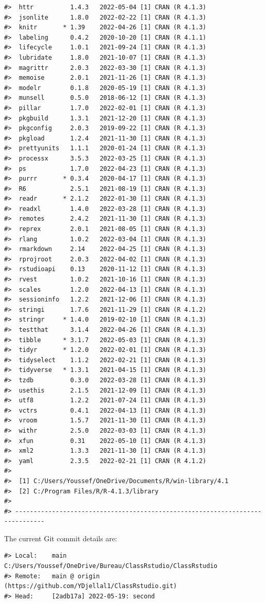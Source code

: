 \documentclass[
]{article}
\begin{document}
\begin{verbatim}
#>  httr          1.4.3   2022-05-04 [1] CRAN (R 4.1.3)
#>  jsonlite      1.8.0   2022-02-22 [1] CRAN (R 4.1.3)
#>  knitr       * 1.39    2022-04-26 [1] CRAN (R 4.1.3)
#>  labeling      0.4.2   2020-10-20 [1] CRAN (R 4.1.1)
#>  lifecycle     1.0.1   2021-09-24 [1] CRAN (R 4.1.3)
#>  lubridate     1.8.0   2021-10-07 [1] CRAN (R 4.1.3)
#>  magrittr      2.0.3   2022-03-30 [1] CRAN (R 4.1.3)
#>  memoise       2.0.1   2021-11-26 [1] CRAN (R 4.1.3)
#>  modelr        0.1.8   2020-05-19 [1] CRAN (R 4.1.3)
#>  munsell       0.5.0   2018-06-12 [1] CRAN (R 4.1.3)
#>  pillar        1.7.0   2022-02-01 [1] CRAN (R 4.1.3)
#>  pkgbuild      1.3.1   2021-12-20 [1] CRAN (R 4.1.3)
#>  pkgconfig     2.0.3   2019-09-22 [1] CRAN (R 4.1.3)
#>  pkgload       1.2.4   2021-11-30 [1] CRAN (R 4.1.3)
#>  prettyunits   1.1.1   2020-01-24 [1] CRAN (R 4.1.3)
#>  processx      3.5.3   2022-03-25 [1] CRAN (R 4.1.3)
#>  ps            1.7.0   2022-04-23 [1] CRAN (R 4.1.3)
#>  purrr       * 0.3.4   2020-04-17 [1] CRAN (R 4.1.3)
#>  R6            2.5.1   2021-08-19 [1] CRAN (R 4.1.3)
#>  readr       * 2.1.2   2022-01-30 [1] CRAN (R 4.1.3)
#>  readxl        1.4.0   2022-03-28 [1] CRAN (R 4.1.3)
#>  remotes       2.4.2   2021-11-30 [1] CRAN (R 4.1.3)
#>  reprex        2.0.1   2021-08-05 [1] CRAN (R 4.1.3)
#>  rlang         1.0.2   2022-03-04 [1] CRAN (R 4.1.3)
#>  rmarkdown     2.14    2022-04-25 [1] CRAN (R 4.1.3)
#>  rprojroot     2.0.3   2022-04-02 [1] CRAN (R 4.1.3)
#>  rstudioapi    0.13    2020-11-12 [1] CRAN (R 4.1.3)
#>  rvest         1.0.2   2021-10-16 [1] CRAN (R 4.1.3)
#>  scales        1.2.0   2022-04-13 [1] CRAN (R 4.1.3)
#>  sessioninfo   1.2.2   2021-12-06 [1] CRAN (R 4.1.3)
#>  stringi       1.7.6   2021-11-29 [1] CRAN (R 4.1.2)
#>  stringr     * 1.4.0   2019-02-10 [1] CRAN (R 4.1.3)
#>  testthat      3.1.4   2022-04-26 [1] CRAN (R 4.1.3)
#>  tibble      * 3.1.7   2022-05-03 [1] CRAN (R 4.1.3)
#>  tidyr       * 1.2.0   2022-02-01 [1] CRAN (R 4.1.3)
#>  tidyselect    1.1.2   2022-02-21 [1] CRAN (R 4.1.3)
#>  tidyverse   * 1.3.1   2021-04-15 [1] CRAN (R 4.1.3)
#>  tzdb          0.3.0   2022-03-28 [1] CRAN (R 4.1.3)
#>  usethis       2.1.5   2021-12-09 [1] CRAN (R 4.1.3)
#>  utf8          1.2.2   2021-07-24 [1] CRAN (R 4.1.3)
#>  vctrs         0.4.1   2022-04-13 [1] CRAN (R 4.1.3)
#>  vroom         1.5.7   2021-11-30 [1] CRAN (R 4.1.3)
#>  withr         2.5.0   2022-03-03 [1] CRAN (R 4.1.3)
#>  xfun          0.31    2022-05-10 [1] CRAN (R 4.1.3)
#>  xml2          1.3.3   2021-11-30 [1] CRAN (R 4.1.3)
#>  yaml          2.3.5   2022-02-21 [1] CRAN (R 4.1.2)
#> 
#>  [1] C:/Users/Youssef/OneDrive/Documents/R/win-library/4.1
#>  [2] C:/Program Files/R/R-4.1.3/library
#> 
#> ------------------------------------------------------------------------------
\end{verbatim}

The current Git commit details are:

\begin{verbatim}
#> Local:    main C:/Users/Youssef/OneDrive/Bureau/ClassRstudio/ClassRstudio
#> Remote:   main @ origin (https://github.com/YDjellal1/ClassRstudio.git)
#> Head:     [2adb17a] 2022-05-19: second
\end{verbatim}
\end{document}
